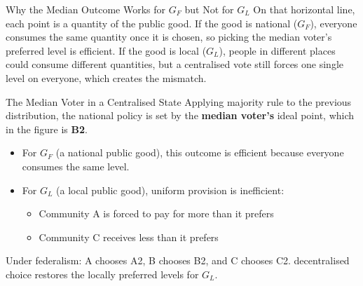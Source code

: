 \documentclass[10pt]{beamer}
\begin{document}
\begin{frame}{Why the Median Outcome Works for $G_F$ but Not for $G_L$}
On that horizontal line, each point is a quantity of the public good. If the good is national ($G_F$), everyone consumes the same quantity once it is chosen, so picking the median voter’s preferred level is efficient. If the good is local ($G_L$), people in different places could consume different quantities, but a centralised vote still forces one single level on everyone, which creates the mismatch.

\begin{center}
\end{center}
\end{frame}




\begin{frame}{The Median Voter in a Centralised State}
Applying majority rule to the previous distribution, the national policy is set by the \textbf{median voter’s} ideal point, which in the figure is \textbf{B2}.

\begin{itemize}
\item For $G_F$ (a national public good), this outcome is efficient because everyone consumes the same level.
\item For $G_L$ (a local public good), uniform provision is inefficient:
\begin{itemize}
\item Community A is forced to pay for more than it prefers
\item Community C receives less than it prefers
\end{itemize}
\end{itemize}

\vspace{0.15cm}
\alert{\footnotesize Under federalism: A chooses A2, B chooses B2, and C chooses C2. decentralised choice restores the locally preferred levels for $G_L$.}
\end{frame}
\end{document}
